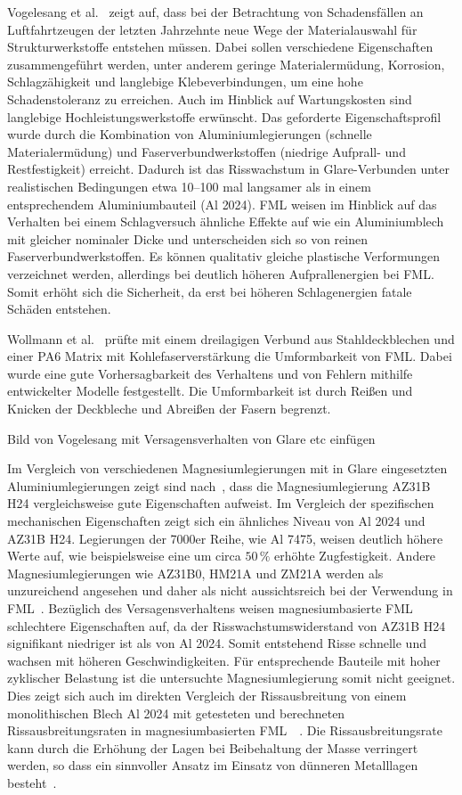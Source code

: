 Vogelesang et al.~\cite{Vogelesang.2000} zeigt auf, dass bei der Betrachtung von Schadensfällen an Luftfahrtzeugen der letzten Jahrzehnte neue Wege der Materialauswahl für Strukturwerkstoffe entstehen müssen.
Dabei sollen verschiedene Eigenschaften zusammengeführt werden, unter anderem geringe Materialermüdung, Korrosion, Schlagzähigkeit und langlebige Klebeverbindungen, um eine hohe Schadenstoleranz zu erreichen.
Auch im Hinblick auf Wartungskosten sind langlebige Hochleistungswerkstoffe erwünscht.
Das geforderte Eigenschaftsprofil wurde durch die Kombination von Aluminiumlegierungen (schnelle Materialermüdung) und Faserverbundwerkstoffen (niedrige Aufprall- und Restfestigkeit) erreicht.
Dadurch ist das Risswachstum in Glare-Verbunden unter realistischen Bedingungen etwa 10--100 mal langsamer als in einem entsprechendem Aluminiumbauteil (Al 2024).
FML weisen im Hinblick auf das Verhalten bei einem Schlagversuch ähnliche Effekte auf wie ein Aluminiumblech mit gleicher nominaler Dicke und unterscheiden sich so von reinen Faserverbundwerkstoffen.
Es können qualitativ gleiche plastische Verformungen verzeichnet werden, allerdings bei deutlich höheren Aufprallenergien bei FML\@.
Somit erhöht sich die Sicherheit, da erst bei höheren Schlagenergien fatale Schäden entstehen.

Wollmann et al.~\cite{Wollmann.2018} prüfte mit einem dreilagigen Verbund aus Stahldeckblechen und einer PA6 Matrix mit Kohlefaserverstärkung die Umformbarkeit von FML\@.
Dabei wurde eine gute Vorhersagbarkeit des Verhaltens und von Fehlern mithilfe entwickelter Modelle festgestellt.
Die Umformbarkeit ist durch Reißen und Knicken der Deckbleche und Abreißen der Fasern begrenzt.

Bild von Vogelesang mit Versagensverhalten von Glare etc einfügen

Im Vergleich von verschiedenen Magnesiumlegierungen mit in Glare eingesetzten Aluminiumlegierungen zeigt sind nach~\cite{Alderliesten.2008}, dass die Magnesiumlegierung AZ31B H24 vergleichsweise gute Eigenschaften aufweist.
Im Vergleich der spezifischen mechanischen Eigenschaften zeigt sich ein ähnliches Niveau von Al 2024 und AZ31B H24.
Legierungen der 7000er Reihe, wie Al 7475, weisen deutlich höhere Werte auf, wie beispielsweise eine um circa $50\,\%$ erhöhte Zugfestigkeit.
Andere Magnesiumlegierungen wie AZ31B0, HM21A und ZM21A werden als unzureichend angesehen und daher als nicht aussichtsreich bei der Verwendung in FML~.
Bezüglich des Versagensverhaltens weisen magnesiumbasierte FML schlechtere Eigenschaften auf, da der Risswachstumswiderstand von AZ31B H24 signifikant niedriger ist als von Al 2024.
Somit entstehend Risse schnelle und wachsen mit höheren Geschwindigkeiten.
Für entsprechende Bauteile mit hoher zyklischer Belastung ist die untersuchte Magnesiumlegierung somit nicht geeignet.
Dies zeigt sich auch im direkten Vergleich der Rissausbreitung von einem monolithischen Blech Al 2024 mit getesteten und berechneten Rissausbreitungsraten in magnesiumbasierten FML~\cite{Alderliesten.2008,Cortes.2005}~.
Die Rissausbreitungsrate kann durch die Erhöhung der Lagen bei Beibehaltung der Masse verringert werden, so dass ein sinnvoller Ansatz im Einsatz von dünneren Metalllagen besteht~\cite{Alderliesten.2008}.

